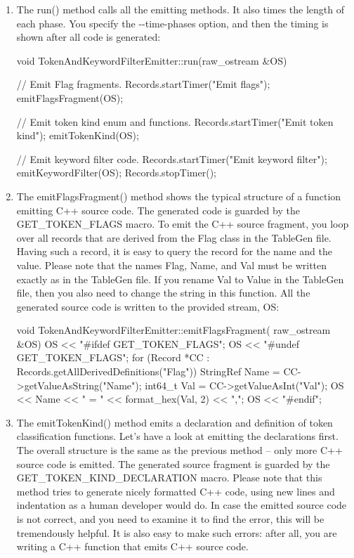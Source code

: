 \begin{enumerate}
\item
The run() method calls all the emitting methods. It also times the length of each phase. You specify the -{}-time-phases option, and then the timing is shown after all code is generated:

\begin{cpp}
void TokenAndKeywordFilterEmitter::run(raw_ostream &OS) {
    // Emit Flag fragments.
    Records.startTimer("Emit flags");
    emitFlagsFragment(OS);

    // Emit token kind enum and functions.
    Records.startTimer("Emit token kind");
    emitTokenKind(OS);

    // Emit keyword filter code.
    Records.startTimer("Emit keyword filter");
    emitKeywordFilter(OS);
    Records.stopTimer();
}
\end{cpp}

\item
The emitFlagsFragment() method shows the typical structure of a function emitting C++ source code. The generated code is guarded by the GET\_TOKEN\_FLAGS macro. To emit the C++ source fragment, you loop over all records that are derived from the Flag class in the TableGen file. Having such a record, it is easy to query the record for the name and the value. Please note that the names Flag, Name, and Val must be written exactly as in the TableGen file. If you rename Val to Value in the TableGen file, then you also need to change the string in this function. All the generated source code is written to the provided stream, OS:

\begin{cpp}
void TokenAndKeywordFilterEmitter::emitFlagsFragment(
raw_ostream &OS) {
    OS << "#ifdef GET_TOKEN_FLAGS\n";
    OS << "#undef GET_TOKEN_FLAGS\n";
    for (Record *CC :
            Records.getAllDerivedDefinitions("Flag")) {
        StringRef Name = CC->getValueAsString("Name");
        int64_t Val = CC->getValueAsInt("Val");
        OS << Name << " = " << format_hex(Val, 2) << ",\n";
    }
    OS << "#endif\n";
}
\end{cpp}

\item
The emitTokenKind() method emits a declaration and definition of token classification functions. Let’s have a look at emitting the declarations first. The overall structure is the same as the previous method – only more C++ source code is emitted. The generated source fragment is guarded by the GET\_TOKEN\_KIND\_DECLARATION macro. Please note that this method tries to generate nicely formatted C++ code, using new lines and indentation as a human developer would do. In case the emitted source code is not correct, and you need to examine it to find the error, this will be tremendously helpful. It is also easy to make such errors: after all, you are writing a C++ function that emits C++ source code.


\end{enumerate}

